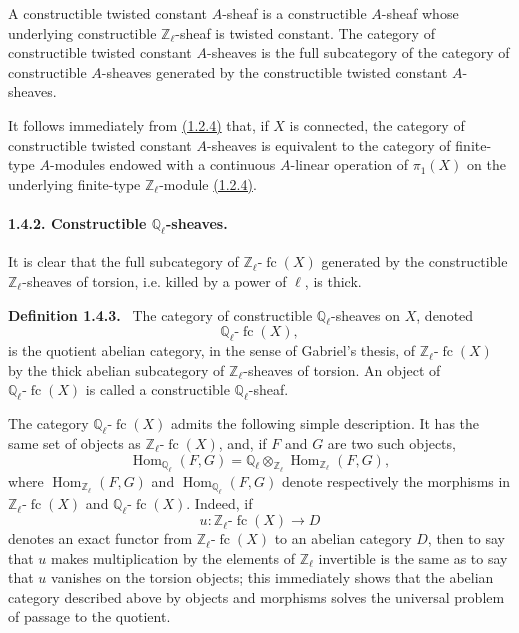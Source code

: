 \documentclass[11pt]{article}
\newenvironment{statement}[1]{\par\medskip\noindent\textbf{#1.}\ }{\par\medskip}
\DeclareMathOperator{\Hom}{Hom}
\providecommand{\Hom}{\operatorname{Hom}}
\providecommand{\fc}{\operatorname{fc}}
\providecommand{\Hom}{\operatorname{Hom}}
\begin{document}
A constructible twisted constant \(A\)-sheaf is a constructible \(A\)-sheaf whose underlying constructible \(\mathbb Z_\ell\)-sheaf is twisted constant. The category of constructible twisted constant \(A\)-sheaves is the full subcategory of the category of constructible \(A\)-sheaves generated by the constructible twisted constant \(A\)-sheaves.

It follows immediately from \hyperref[sga5:VI:subsubsection:1.2.4]{(1.2.4)} that, if \(X\) is connected, the category of constructible twisted constant \(A\)-sheaves is equivalent to the category of finite-type \(A\)-modules endowed with a continuous \(A\)-linear operation of \(\pi_1(X)\) on the underlying finite-type \(\mathbb Z_\ell\)-module \hyperref[sga5:VI:subsubsection:1.2.4]{(1.2.4)}.

\paragraph{1.4.2. Constructible \(\mathbb Q_\ell\)-sheaves.}\label{sga5:VI:paragraph:1.4.2}
It is clear that the full subcategory of \(\mathbb Z_\ell\text{-}\fc(X)\) generated by the constructible \(\mathbb Z_\ell\)-sheaves of torsion, i.e. killed by a power of \(\ell\), is thick.

\label{sga5:VI:definition:1.4.3}\begin{statement}{Definition 1.4.3}
The category of constructible \(\mathbb Q_\ell\)-sheaves on \(X\), denoted
\[
\mathbb Q_\ell\text{-}\fc(X),
\]
is the quotient abelian category, in the sense of Gabriel's thesis, of \(\mathbb Z_\ell\text{-}\fc(X)\) by the thick abelian subcategory of \(\mathbb Z_\ell\)-sheaves of torsion. An object of \(\mathbb Q_\ell\text{-}\fc(X)\) is called a constructible \(\mathbb Q_\ell\)-sheaf.
\end{statement}

The category \(\mathbb Q_\ell\text{-}\fc(X)\) admits the following simple description. It has the same set of objects as \(\mathbb Z_\ell\text{-}\fc(X)\), and, if \(F\) and \(G\) are two such objects,
\[
\Hom_{\mathbb Q_\ell}(F,G)
=\mathbb Q_\ell\otimes_{\mathbb Z_\ell}\Hom_{\mathbb Z_\ell}(F,G),
\]
where \(\Hom_{\mathbb Z_\ell}(F,G)\) and \(\Hom_{\mathbb Q_\ell}(F,G)\) denote respectively the morphisms in \(\mathbb Z_\ell\text{-}\fc(X)\) and \(\mathbb Q_\ell\text{-}\fc(X)\). Indeed, if
\[
u:\mathbb Z_\ell\text{-}\fc(X)\longrightarrow D
\]
denotes an exact functor from \(\mathbb Z_\ell\text{-}\fc(X)\) to an abelian category \(D\), then to say that \(u\) makes multiplication by the elements of \(\mathbb Z_\ell\) invertible is the same as to say that \(u\) vanishes on the torsion objects; this immediately shows that the abelian category described above by objects and morphisms solves the universal problem of passage to the quotient.
\end{document}
